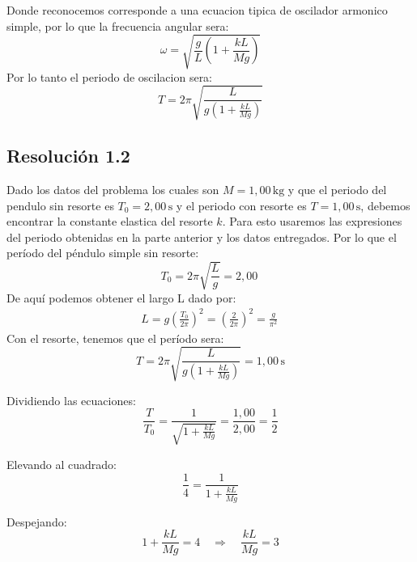 \documentclass[
  11pt,
  letterpaper,
   addpoints,
  ]{exam}
\begin{document}
\begin{questions}
\begin{solution}
Donde reconocemos corresponde a una ecuacion tipica de oscilador armonico simple, por lo que la frecuencia angular sera:
\begin{equation}
  \omega = \sqrt{\frac{g}{L}\left(1 + \frac{kL}{Mg}\right)}
\end{equation}
Por lo tanto el periodo de oscilacion sera:
\begin{equation}
  \boxed{T = 2\pi\sqrt{\frac{L}{g\left(1 + \frac{kL}{Mg}\right)}}}
\end{equation}

  \subsection*{Resolución 1.2}
  Dado los datos del problema los cuales son $M=1{,}00\,\mathrm{kg}$ y que el periodo del pendulo sin resorte es $T_0 = 2{,}00\,\mathrm{s}$ y el periodo con resorte es $T = 1{,}00\,\mathrm{s}$, debemos encontrar la constante elastica del resorte $k$. Para esto usaremos las expresiones del periodo obtenidas en la parte anterior y los datos entregados. Por lo que   el período del péndulo simple sin resorte:
  \begin{equation}
    T_0 = 2\pi\sqrt{\frac{L}{g}} = 2{,}00\
  \end{equation}
  De aquí podemos obtener el largo L dado por:
  \begin{align}
    L = g \left(\frac{T_0}{2\pi}\right)^2 = \left(\frac{2}{2\pi}\right)^2 = \frac{g}{\pi^2}\,
  \end{align}
  Con el resorte, tenemos que el período sera:
  \begin{equation}
    T = 2\pi\sqrt{\frac{L}{g\left(1 + \frac{kL}{Mg}\right)}} = 1{,}00\,\mathrm{s}
  \end{equation}
  
  Dividiendo las ecuaciones:
  \begin{equation}
    \frac{T}{T_0} = \frac{1}{\sqrt{1 + \frac{kL}{Mg}}} = \frac{1{,}00}{2{,}00} = \frac{1}{2}
  \end{equation}
  
  Elevando al cuadrado:
  \begin{equation}
    \frac{1}{4} = \frac{1}{1 + \frac{kL}{Mg}}
  \end{equation}
  
  Despejando:
  \begin{equation}
    1 + \frac{kL}{Mg} = 4 \quad \Rightarrow \quad \frac{kL}{Mg} = 3
  \end{equation}
  

\end{solution}
\end{questions}
\end{document}

